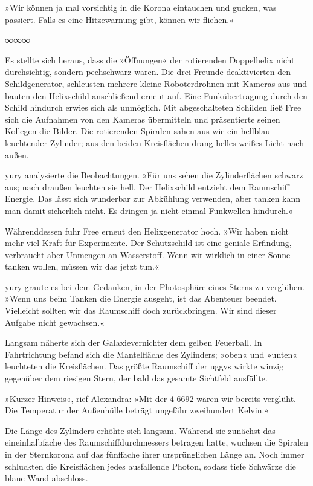 »Wir können ja mal vorsichtig in die Korona eintauchen und gucken, was passiert. Falls es eine Hitzewarnung gibt, können wir fliehen.«

\begin{center}
∞∞∞
\end{center}

Es stellte sich heraus, dass die »Öffnungen« der rotierenden Doppelhelix nicht durchsichtig, sondern pechschwarz waren. Die drei Freunde deaktivierten den Schildgenerator, schleusten mehrere kleine Roboterdrohnen mit Kameras aus und bauten den Helixschild anschließend erneut auf. Eine Funkübertragung durch den Schild hindurch erwies sich als unmöglich. Mit abgeschalteten Schilden ließ Free sich die Aufnahmen von den Kameras übermitteln und präsentierte seinen Kollegen die Bilder. Die rotierenden Spiralen sahen aus wie ein hellblau leuchtender Zylinder; aus den beiden Kreisflächen drang helles weißes Licht nach außen.

yury analysierte die Beobachtungen. »Für uns sehen die Zylinderflächen schwarz aus; nach draußen leuchten sie hell. Der Helixschild entzieht dem Raumschiff Energie. Das lässt sich wunderbar zur Abkühlung verwenden, aber tanken kann man damit sicherlich nicht. Es dringen ja nicht einmal Funkwellen hindurch.«

Währenddessen fuhr Free erneut den Helixgenerator hoch. »Wir haben nicht mehr viel Kraft für Experimente. Der Schutzschild ist eine geniale Erfindung, verbraucht aber Unmengen an Wasserstoff. Wenn wir wirklich in einer Sonne tanken wollen, müssen wir das jetzt tun.«

yury graute es bei dem Gedanken, in der Photosphäre eines Sterns zu verglühen. »Wenn uns beim Tanken die Energie ausgeht, ist das Abenteuer beendet. Vielleicht sollten wir das Raumschiff doch zurückbringen. Wir sind dieser Aufgabe nicht gewachsen.«

Langsam näherte sich der Galaxievernichter dem gelben Feuerball. In Fahrtrichtung befand sich die Mantelfläche des Zylinders; »oben« und »unten« leuchteten die Kreisflächen. Das größte Raumschiff der uggys wirkte winzig gegenüber dem riesigen Stern, der bald das gesamte Sichtfeld ausfüllte.

»Kurzer Hinweis«, rief Alexandra: »Mit der 4-6692 wären wir bereits verglüht. Die Temperatur der Außenhülle beträgt ungefähr zweihundert Kelvin.«

Die Länge des Zylinders erhöhte sich langsam. Während sie zunächst das eineinhalbfache des Raumschiffdurchmessers betragen hatte, wuchsen die Spiralen in der Sternkorona auf das fünffache ihrer ursprünglichen Länge an. Noch immer schluckten die Kreisflächen jedes ausfallende Photon, sodass tiefe Schwärze die blaue Wand abschloss.

